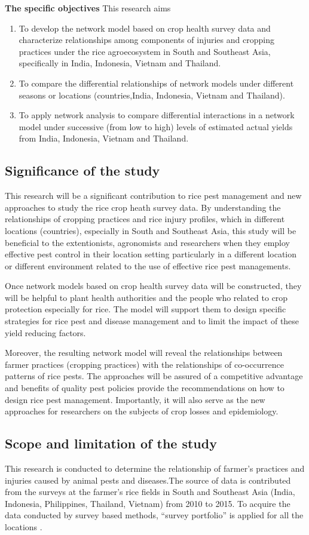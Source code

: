 \textbf{The specific objectives}
This research aims 
\begin{enumerate}
\item To develop the network model based on crop health survey data and characterize relationships among components of injuries and cropping practices under the rice agroecosystem in South and Southeast Asia, specifically in India, Indonesia, Vietnam and Thailand.
\item To compare the differential relationships of network models under different seasons or locations (countries,India, Indonesia, Vietnam and Thailand). 
\item To apply network analysis to compare differential interactions in a network model under successive (from low to high) levels of estimated actual yields from India, Indonesia, Vietnam and Thailand.
\end{enumerate}

\subsection{Significance of the study}

This research will be a significant contribution to rice pest management and  new approaches to study the rice crop heath survey data. By understanding the relationships of cropping practices and rice injury profiles, which in different locations (countries), especially in South and Southeast Asia, this study will be beneficial to the extentionists, agronomists and researchers when they employ effective pest control in their location setting particularly in a different location or different environment related to the use of effective rice pest managements.

Once network models based on crop health survey data will be constructed, they will be helpful to plant health authorities and the people who related to crop protection especially for rice. The model will support them to design specific strategies for rice pest and disease management and to limit the impact of these yield reducing factors.

Moreover, the resulting network model will reveal the relationships between farmer practices (cropping practices) with the relationships of co-occurrence patterns of rice pests. The approaches will be assured of a competitive advantage and benefits of quality pest policies provide the recommendations on how to design rice pest management. Importantly, it will also serve as the new approaches for researchers on the subjects of crop losses  and epidemiology.

\subsection{Scope and limitation of the study}

This research is conducted to determine the relationship of farmer's practices and injuries caused by animal pests and diseases.The source of data is contributed from the surveys at the farmer's rice fields in South and Southeast Asia (India, Indonesia, Philippines, Thailand, Vietnam) from 2010 to 2015. To acquire the data conducted by survey based methods, ``survey portfolio'' is applied for all the locations \citep{Savary_2009_Survey}.
